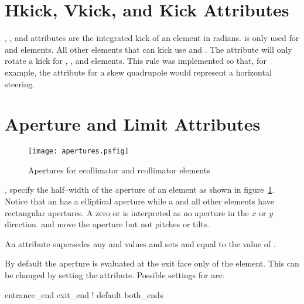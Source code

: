 \section{Hkick, Vkick, and Kick Attributes}
\label{s:kick}

, , and  attributes are the integrated
kick of an element in radians.  is only used for 
and  elements. All other elements that can kick use 
 and . The  attribute will only rotate
a kick for , ,  and 
elements. This rule was implemented so that, for example, the 
 attribute for a skew quadrupole
would represent a horizontal steering.

\section{Aperture and Limit Attributes}
\label{s:limit}

\begin{figure}
  \centering
  \texttt{[image: apertures.psfig]}
  \caption{Apertures for ecollimator and rcollimator elements}
  \label{f:limit}
\end{figure}

,  specify the half--width of the aperture of
an element as shown in figure~\ref{f:limit}. Notice that an 
has a elliptical aperture while a  and all other elements
have rectangular apertures. A zero  or
 is interpreted as no aperture in the $x$ or $y$
direction.  and  move the aperture but not
pitches or tilts.

An  attribute supersedes
any  and  values and sets  and
 equal to the value of .

By default the aperture is evaluated at the exit face only of the
element. This can be changed by setting the  attribute.
Possible settings for  are:
\begin{example}
  entrance_end
  exit_end  ! default
  both_ends
\end{example}

